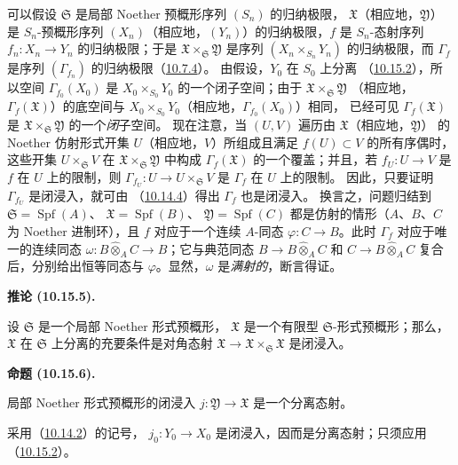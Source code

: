 \documentclass[UTF8,fontset=none,11pt,oneside,openany]{ctexbook}
\newenvironment{proposition}[1][]{%
  \par\medskip\noindent\textbf{命题 (#1).}\ %
}{\par}
\newenvironment{corollary}[1][]{%
  \par\medskip\noindent\textbf{推论 (#1).}\ %
}{\par}
\let\EGAOriginalLabel\label
\renewcommand{\label}[1]{\phantomsection\EGAOriginalLabel{#1}}
\begin{document}
可以假设 $\mathfrak{S}$ 是局部 Noether 预概形序列 $(S_n)$ 的归纳极限，
$\mathfrak{X}$（相应地，$\mathfrak{Y}$）是 $S_n$-预概形序列
$(X_n)$（相应地，$(Y_n)$）的归纳极限，$f$ 是 $S_n$-态射序列
$f_n:X_n\to Y_n$ 的归纳极限；于是
$\mathfrak{X}\times_{\mathfrak{S}}\mathfrak{Y}$ 是序列
$(X_n\times_{S_n}Y_n)$ 的归纳极限，而 $\Gamma_f$ 是序列
$(\Gamma_{f_n})$ 的归纳极限（\hyperref[I.10.7.4-fr]{10.7.4}）。
由假设，$Y_0$ 在 $S_0$ 上分离
（\hyperref[I.10.15.2-fr]{10.15.2}），所以空间
$\Gamma_{f_0}(X_0)$ 是 $X_0\times_{S_0}Y_0$ 的一个闭子空间；由于
$\mathfrak{X}\times_{\mathfrak{S}}\mathfrak{Y}$
（相应地，$\Gamma_f(\mathfrak{X})$）的底空间与
$X_0\times_{S_0}Y_0$（相应地，$\Gamma_{f_0}(X_0)$）相同，
已经可见 $\Gamma_f(\mathfrak{X})$ 是
$\mathfrak{X}\times_{\mathfrak{S}}\mathfrak{Y}$ 的一个\emph{闭}子空间。
现在注意，当 $(U,V)$ 遍历由 $\mathfrak{X}$（相应地，$\mathfrak{Y}$）
的 Noether 仿射形式开集 $U$（相应地，$V$）所组成且满足
$f(U)\subset V$ 的所有序偶时，这些开集
$U\times_{\mathfrak{S}}V$ 在
$\mathfrak{X}\times_{\mathfrak{S}}\mathfrak{Y}$ 中构成
$\Gamma_f(\mathfrak{X})$ 的一个覆盖；并且，若
$f_U:U\to V$ 是 $f$ 在 $U$ 上的限制，则
$\Gamma_{f_U}:U\to U\times_{\mathfrak{S}}V$ 是 $\Gamma_f$ 在 $U$ 上的限制。
因此，只要证明 $\Gamma_{f_U}$ 是闭浸入，就可由
（\hyperref[I.10.14.4-fr]{10.14.4}）得出 $\Gamma_f$ 也是闭浸入。
换言之，问题归结到
$\mathfrak{S}=\operatorname{Spf}(A)$、
$\mathfrak{X}=\operatorname{Spf}(B)$、
$\mathfrak{Y}=\operatorname{Spf}(C)$ 都是仿射的情形（$A$、$B$、$C$
为 Noether 进制环），且 $f$ 对应于一个连续 $A$-同态
$\varphi:C\to B$。此时 $\Gamma_f$ 对应于唯一的连续同态
$\omega:B\widehat{\otimes}_A C\to B$；它与典范同态
$B\to B\widehat{\otimes}_A C$ 和
$C\to B\widehat{\otimes}_A C$ 复合后，分别给出恒等同态与
$\varphi$。显然，$\omega$ 是\emph{满射的}，断言得证。

\begin{corollary}[10.15.5]
\label{I.10.15.5-fr}
设 $\mathfrak{S}$ 是一个局部 Noether 形式预概形，
$\mathfrak{X}$ 是一个有限型 $\mathfrak{S}$-形式预概形；那么，
$\mathfrak{X}$ 在 $\mathfrak{S}$ 上分离的充要条件是对角态射
$\mathfrak{X}\to\mathfrak{X}\times_{\mathfrak{S}}\mathfrak{X}$ 是闭浸入。
\end{corollary}

\begin{proposition}[10.15.6]
\label{I.10.15.6-fr}
局部 Noether 形式预概形的闭浸入
$j:\mathfrak{Y}\to\mathfrak{X}$ 是一个分离态射。
\end{proposition}

采用（\hyperref[I.10.14.2-fr]{10.14.2}）的记号，
$j_0:Y_0\to X_0$ 是闭浸入，因而是分离态射；只须应用
（\hyperref[I.10.15.2-fr]{10.15.2}）。
\end{document}
